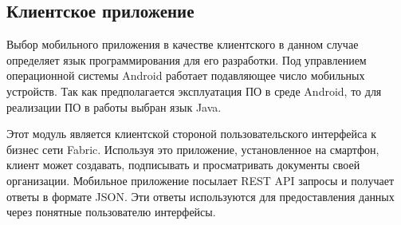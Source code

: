 
\subsection{Клиентское приложение}
 \label{subsec:ch2/sec3/subsec4}
 
Выбор мобильного приложения в качестве клиентского в данном случае определяет язык программирования для его разработки.
Под управлением операционной системы Android работает подавляющее число мобильных устройств. Так как предполагается эксплуатация ПО в среде Android, то для реализации ПО в работы выбран язык Java.
 
Этот модуль является  клиентской стороной пользовательского интерфейса к бизнес сети Fabric.  Используя это приложение,  установленное  на смартфон,  клиент  может создавать, подписывать и просматривать документы своей организации.  Мобильное приложение посылает REST API запросы и получает ответы в формате JSON. Эти ответы  используются  для  предоставления  данных  через  понятные  пользователю интерфейсы.
 
